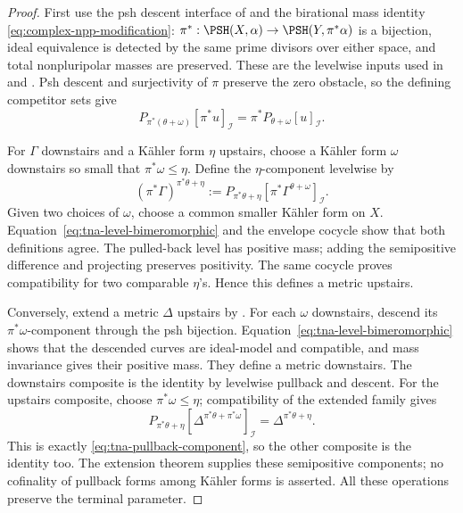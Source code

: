 \begin{proof}
First use the psh descent interface of
\cite[Section~4.8]{XiaOperationsV3} and the birational mass identity
\eqref{eq:complex-npp-modification}:
$\pi^*: \PSH(X,\alpha)\to\PSH(Y,\pi^*\alpha)$ is a bijection,
ideal equivalence is detected by the same prime divisors over either
space, and total nonpluripolar masses are preserved.
These are the levelwise inputs used in
\cite[Corollary~13.1.1]{XiaBook} and
\cite[Section~4.8]{XiaOperationsV3}.
Psh descent and surjectivity of $\pi$ preserve the zero obstacle,
so the defining competitor sets give
\[
 P_{\pi^*(\theta+\omega)}[\pi^*u]_{\mathcal I}
 =\pi^*P_{\theta+\omega}[u]_{\mathcal I}.
\tag{53.25}\label{eq:tna-level-bimeromorphic}
\]

For $\Gamma$ downstairs and a K\"ahler form $\eta$ upstairs,
choose a K\"ahler form $\omega$ downstairs so small that
$\pi^*\omega\leq\eta$.  Define the $\eta$-component levelwise by
\[
 (\pi^*\Gamma)^{\pi^*\theta+\eta}
 :=P_{\pi^*\theta+\eta}
       [\pi^*\Gamma^{\theta+\omega}]_{\mathcal I}.
\tag{53.25a}\label{eq:tna-pullback-component}
\]
Given two choices of $\omega$, choose a common smaller K\"ahler form
on $X$.  Equation~\eqref{eq:tna-level-bimeromorphic} and the envelope
cocycle show that both definitions agree.  The pulled-back level has
positive mass; adding the semipositive difference and projecting
preserves positivity.  The same cocycle proves compatibility for two
comparable $\eta$'s.  Hence this defines a metric upstairs.

Conversely, extend a metric $\Delta$ upstairs by
.  For each $\omega$ downstairs,
descend its $\pi^*\omega$-component through the psh bijection.
Equation~\eqref{eq:tna-level-bimeromorphic} shows that the descended
curves are ideal-model and compatible, and mass invariance gives their
positive mass.  They define a metric downstairs.
The downstairs composite is the identity by levelwise pullback and
descent.  For the upstairs composite, choose $\pi^*\omega\leq\eta$;
compatibility of the extended family gives
\[
 P_{\pi^*\theta+\eta}
      [\Delta^{\pi^*\theta+\pi^*\omega}]_{\mathcal I}
 =\Delta^{\pi^*\theta+\eta}.
\]
This is exactly \eqref{eq:tna-pullback-component}, so the other composite
is the identity too.  The extension theorem supplies these semipositive
components; no cofinality of pullback forms among K\"ahler forms is
asserted.  All these operations preserve the terminal parameter.


\end{proof}
